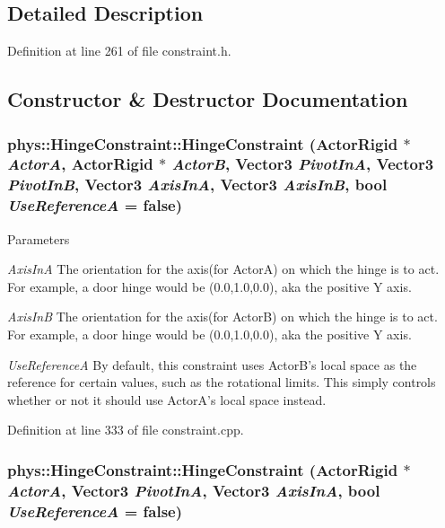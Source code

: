 \subsection{Detailed Description}


Definition at line 261 of file constraint.h.



\subsection{Constructor \& Destructor Documentation}
\hypertarget{classphys_1_1HingeConstraint_a079d149580bb7f60e09532a938352141}{
\subsubsection[{HingeConstraint}]{\setlength{\rightskip}{0pt plus 5cm}phys::HingeConstraint::HingeConstraint ({\bf ActorRigid} $\ast$ {\em ActorA}, \/  {\bf ActorRigid} $\ast$ {\em ActorB}, \/  {\bf Vector3} {\em PivotInA}, \/  {\bf Vector3} {\em PivotInB}, \/  {\bf Vector3} {\em AxisInA}, \/  {\bf Vector3} {\em AxisInB}, \/  bool {\em UseReferenceA} = {\ttfamily false})}}
\label{d3/d0d/classphys_1_1HingeConstraint_a079d149580bb7f60e09532a938352141}

\begin{DoxyParams}{Parameters}
\item[{\em AxisInA}]The orientation for the axis(for ActorA) on which the hinge is to act. For example, a door hinge would be (0.0,1.0,0.0), aka the positive Y axis. \item[{\em AxisInB}]The orientation for the axis(for ActorB) on which the hinge is to act. For example, a door hinge would be (0.0,1.0,0.0), aka the positive Y axis. \item[{\em UseReferenceA}]By default, this constraint uses ActorB's local space as the reference for certain values, such as the rotational limits. This simply controls whether or not it should use ActorA's local space instead. \end{DoxyParams}


Definition at line 333 of file constraint.cpp.

\hypertarget{classphys_1_1HingeConstraint_aa49fe941387343b75d26a3603aafe09e}{
\subsubsection[{HingeConstraint}]{\setlength{\rightskip}{0pt plus 5cm}phys::HingeConstraint::HingeConstraint ({\bf ActorRigid} $\ast$ {\em ActorA}, \/  {\bf Vector3} {\em PivotInA}, \/  {\bf Vector3} {\em AxisInA}, \/  bool {\em UseReferenceA} = {\ttfamily false})}}
\label{d3/d0d/classphys_1_1HingeConstraint_aa49fe941387343b75d26a3603aafe09e}

